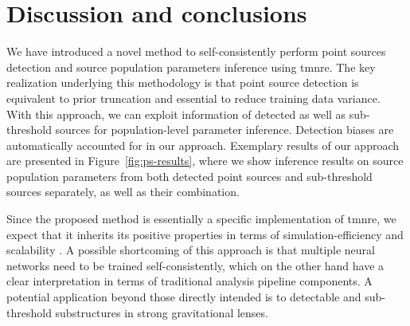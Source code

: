 \section{Discussion and conclusions}
\label{sec:ps-conclusions}

We have introduced a novel method to self-consistently perform point sources detection and source population parameters inference using \gls*{tmnre}. The key realization underlying this methodology is that point source detection is equivalent to prior truncation and essential to reduce training data variance. With this approach, we can exploit information of detected as well as sub-threshold sources for population-level parameter inference. Detection biases are automatically accounted for in our approach. Exemplary results of our approach are presented in Figure~\ref{fig:ps-results}, where we show inference results on source population parameters from both detected point sources and sub-threshold sources separately, as well as their combination. 

Since the proposed method is essentially a specific implementation of  \gls*{tmnre}, we expect that it inherits its positive properties in terms of simulation-efficiency and scalability \cite{Miller:2021aa}. A possible shortcoming of this approach is that multiple neural networks need to be trained self-consistently, which on the other hand have a clear interpretation in terms of traditional analysis pipeline components. A potential application beyond those directly intended is to detectable and sub-threshold substructures in strong gravitational lenses.



  
%  
%  

  
